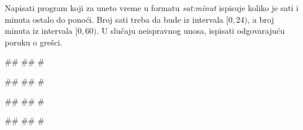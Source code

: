 \begin{Exercise}[label=KT_NG_06] 
Napisati program koji za uneto vreme u formatu \textit{sat:minut} ispisuje koliko je sati i minuta ostalo do ponoći. Broj sati treba da bude iz intervala $[0,24)$, a broj minuta iz intervala $[0,60)$. 
U slučaju neispravnog unosa, ispisati odgovarajuću poruku o grešci.

\begin{miditest}
\begin{upotreba}{1}
#\naslovInt#
##
#
\end{upotreba}
\end{miditest}
\begin{miditest}
\begin{upotreba}{2}
#\naslovInt#
##
#
\end{upotreba}
\end{miditest}

\begin{miditest}
\begin{upotreba}{3}
#\naslovInt#
##
#
\end{upotreba}
\end{miditest}
\begin{miditest}
\begin{upotreba}{4}
#\naslovInt#
##
#
\end{upotreba}
\end{miditest}

\end{Exercise}
\ifresenja
 \begin{Answer}[ref=KT_NG_06]
\end{Answer}
\fi


